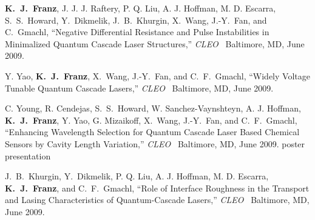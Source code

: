 \begin{list}{}{
  \setlength{\leftmargin}{0.25in}
  \setlength{\rightmargin}{0.25in}
  \setlength{\itemsep}{6pt}
}
\item \textbf{K.~J.~Franz}, J. J. J. Raftery, P. Q. Liu, A. J. Hoffman, M. D. Escarra, S.~S.~Howard, Y.~Dikmelik, J.~B.~Khurgin, X.~Wang, \mbox{J.-Y.~Fan}, and C.~Gmachl, ``Negative Differential Resistance and Pulse Instabilities in Minimalized Quantum Cascade Laser Structures,'' \emph{CLEO}~ Baltimore, MD, June 2009.
\item Y. Yao, \textbf{K.~J.~Franz}, X.~Wang, \mbox{J.-Y.~Fan}, and C.~F.~Gmachl, ``Widely Voltage Tunable Quantum Cascade Lasers,'' \emph{CLEO}~ Baltimore, MD, June 2009.
\item C. Young, R. Cendejas, S.~S.~Howard, W. Sanchez-Vaynshteyn, A. J. Hoffman, \textbf{K.~J.~Franz}, Y. Yao, G. Mizaikoff, X.~Wang, \mbox{J.-Y.~Fan}, and C.~F.~Gmachl, ``Enhancing Wavelength Selection for Quantum Cascade Laser Based Chemical Sensors by Cavity Length Variation,'' \emph{CLEO}~ Baltimore, MD, June 2009. poster presentation
\item J.~B.~Khurgin, Y.~Dikmelik, P. Q. Liu, A. J. Hoffman, M. D. Escarra, \textbf{K.~J.~Franz}, and C.~F.~Gmachl, ``Role of Interface Roughness in the Transport and Lasing Characteristics of Quantum-Cascade Lasers,'' \emph{CLEO}~ Baltimore, MD, June 2009.
%
\end{list}

% 